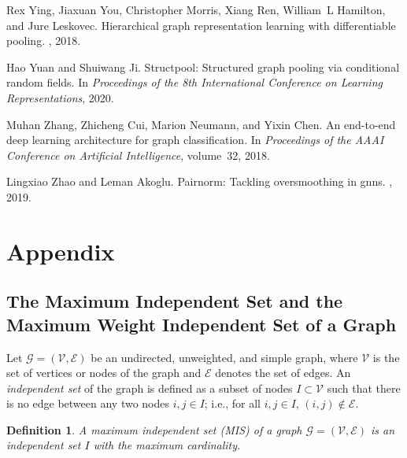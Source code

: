 \documentclass{article}
\newtheorem{definition}{Definition}
\begin{document}
\begin{thebibliography}{999}
	Rex Ying, Jiaxuan You, Christopher Morris, Xiang Ren, William~L Hamilton, and
	Jure Leskovec.
	\newblock Hierarchical graph representation learning with differentiable
	pooling.
	, 2018.
	
	Hao Yuan and Shuiwang Ji.
	\newblock Structpool: Structured graph pooling via conditional random fields.
	\newblock In {\em Proceedings of the 8th International Conference on Learning
		Representations}, 2020.
	
	Muhan Zhang, Zhicheng Cui, Marion Neumann, and Yixin Chen.
	\newblock An end-to-end deep learning architecture for graph classification.
	\newblock In {\em Proceedings of the AAAI Conference on Artificial
		Intelligence}, volume~32, 2018.
	
	Lingxiao Zhao and Leman Akoglu.
	\newblock Pairnorm: Tackling oversmoothing in gnns.
	, 2019.
	
\end{thebibliography}


\appendix

\section{Appendix}
\subsection{The Maximum Independent Set and the Maximum Weight Independent Set of a Graph}
Let $\mathcal{G} = (\mathcal{V}, \mathcal{E})$ be an undirected, unweighted, and simple graph, where $\mathcal{V}$ is the set of vertices or nodes of the graph and $\mathcal{E}$ denotes the set of edges. An \textit{independent set} of the graph is defined as a subset of nodes $I \subset \mathcal{V}$ such that there is no edge between any two nodes $i, j \in I$; i.e., for all $i, j \in I$, $(i, j) \notin \mathcal{E}$.

\begin{definition}
	A maximum independent set (MIS) of a graph $\mathcal{G} = (\mathcal{V}, \mathcal{E})$ is an independent set $I$ with the maximum cardinality.
\end{definition}
\end{document}
